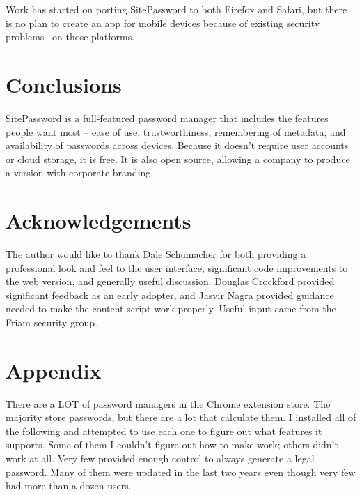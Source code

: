 Work has started on porting SitePassword to both Firefox and Safari, 
but there is no plan to create an app for mobile devices because of 
existing security problems~\cite{oesch} on those platforms.

\section{Conclusions}\label{sec:conclusions}

SitePassword is a full-featured password manager that includes the features people want most -- ease of use, trustworthiness, remembering of metadata, and availability of passwords across devices.  Because it doesn't require user accounts or cloud storage, it is free.  It is also open source, allowing a company to produce a version with corporate branding.

\section*{Acknowledgements}\label{sec:acks}

The author would like to thank Dale Schumacher for both providing a professional look and feel to the user interface, significant code improvements to the web version, and generally useful discussion.  Douglas Crockford provided significant feedback as an early adopter, and Jasvir Nagra provided guidance needed to make the content script work properly.  Useful input came from the Friam security group.




\pagebreak

\onecolumn
\section*{Appendix}\label{sec:appendix}

There are a LOT of password managers in the Chrome extension store.  The majority store passwords, but there are a lot that calculate them.  I installed all of the following and attempted to use each one to figure out what features it supports.  Some of them I couldn't figure out how to make work; others didn't work at all.  Very few provided enough control to always generate a legal password.  Many of them were updated in the last two years even though very few had more than a dozen users.

